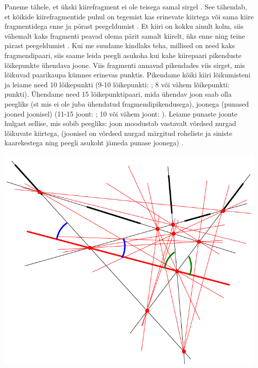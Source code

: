 \solu
Paneme tähele, et ükski kiirefragment ei ole teisega samal sirgel . See tähendab, et kõikide kiirefragmentide puhul on tegemist kas erinevate kiirtega või sama kiire fragmentidega enne ja pörast peegeldumist . Et kiiri on kokku ainult kolm, siis vähemalt kaks fragmenti peavad olema pärit samalt kiirelt, üks enne ning teine pärast peegeldumist . Kui me suudame kindlaks teha, millised on need kaks fragmendipaari, siis saame leida peegli asukoha kui kahe kiirepaari pikenduste lõikepunkte ühendava joone. Viis fragmenti annavad pikendades viis sirget, mis lõikuvad paarikaupa kümnes erinevas punktis. Pikendame kõiki kiiri lõikumisteni ja leiame need 10 lõikepunkti (9-10 lõikepunkti: ; 8 või vähem lõikepunkti:  punkti). Ühendame need 15 lõikepunktipaari, mida ühendav joon saab olla peegliks (st mis ei ole juba ühendatud fragmendipikendusega), joonega (punased jooned joonisel) (11-15 joont: ; 10 või vähem joont: ). Leiame punaste joonte hulgast sellise, mis sobib peegliks: joon moodustab vastavalt võrdsed nurgad lõikuvate kiirtega, (joonisel on võrdsed nurgad märgitud roheliste ja siniste kaarekestega ning peegli asukoht jämeda punase joonega) . 
\begin{center}
\includegraphics[scale=0.7]{2019-v2g-02-sol.pdf}
\end{center}
\probend